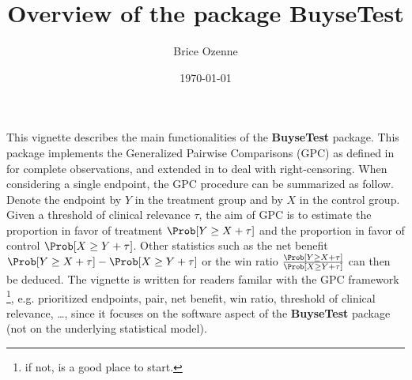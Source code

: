 \documentclass[12pt]{article}
\author{Brice Ozenne}
\date{\today}
\title{Overview of the package BuyseTest}
\begin{document}
\maketitle
This vignette describes the main functionalities of the \textbf{BuyseTest}
package. This package implements the Generalized Pairwise Comparisons
(GPC) as defined in \cite{buyse2010generalized} for complete
observations, and extended in \cite{peron2018extension} to deal with
right-censoring. When considering a single endpoint, the GPC procedure
can be summarized as follow. Denote the endpoint by \(Y\) in the
treatment group and by \(X\) in the control group. Given a threshold
of clinical relevance \(\tau\), the aim of GPC is to estimate the
proportion in favor of treatment \(\Prob[Y \geq X + \tau]\) and the
proportion in favor of control \(\Prob[X \geq Y + \tau]\). Other
statistics such as the net benefit \(\Prob[Y \geq X + \tau]-\Prob[X
\geq Y + \tau]\) or the win ratio \(\frac{\Prob[Y \geq X +
\tau]}{\Prob[X \geq Y + \tau]}\) can then be deduced. The vignette is
written for readers familar with the GPC framework \footnote{if not,
\cite{buyse2010generalized} is a good place to start.}, e.g. prioritized
endpoints, pair, net benefit, win ratio, threshold of clinical
relevance, \ldots, since it focuses on the software aspect
of the \textbf{BuyseTest} package (not on the underlying statistical model).

\bigskip
\end{document}
